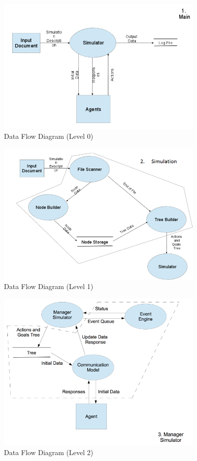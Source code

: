 \documentclass{article}
\begin{document}
\begin{figure}[!]
\centering
\includegraphics[width=4.0in]{fig3}
\caption{Data Flow Diagram (Level 0)}
\label{fig_sim}
\end{figure}
\newpage

\begin{figure}[!]
\centering
\includegraphics[width=4.0in]{fig4}
\caption{Data Flow Diagram (Level 1)}
\label{fig_sim}
\end{figure}
\newpage

\begin{figure}[!]
\centering
\includegraphics[width=4.0in]{fig5}
\caption{Data Flow Diagram (Level 2)}
\label{fig_sim}
\end{figure}
\end{document}
